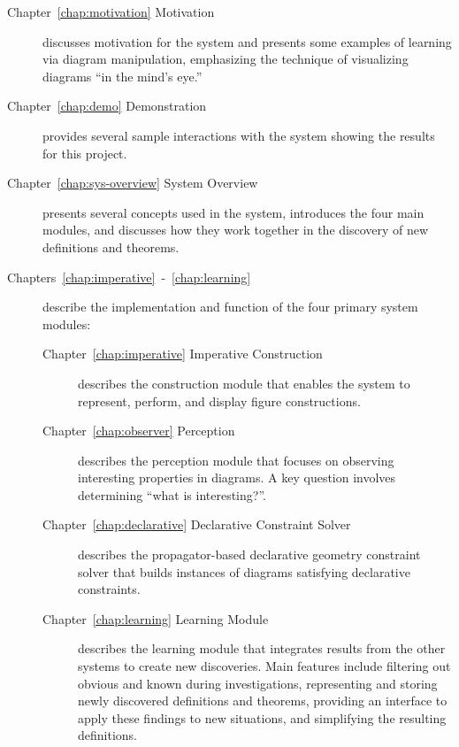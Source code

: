\begin{description}

\item [Chapter~\ref{chap:motivation} Motivation] discusses motivation
  for the system and presents some examples of learning via diagram
  manipulation, emphasizing the technique of visualizing diagrams ``in
  the mind's eye.''

\item [Chapter~\ref{chap:demo} Demonstration] provides several sample
  interactions with the system showing the results for this project.

\item[Chapter~\ref{chap:sys-overview} System Overview] presents
  several concepts used in the system, introduces the four main
  modules, and discusses how they work together in the discovery of
  new definitions and theorems.

\item[Chapters~\ref{chap:imperative}~-~\ref{chap:learning}] describe
  the implementation and function of the four primary system modules:

\begin{description}
\item[Chapter~\ref{chap:imperative} Imperative Construction]
  describes the construction module that enables the system to
  represent, perform, and display figure constructions.

\item[Chapter~\ref{chap:observer} Perception] describes the perception
  module that focuses on observing interesting properties in
  diagrams. A key question involves determining ``what is
  interesting?''.

\item[Chapter~\ref{chap:declarative} Declarative Constraint Solver]
  describes the propagator-based declarative geometry constraint
  solver that builds instances of diagrams satisfying declarative
  constraints.

\item[Chapter~\ref{chap:learning} Learning Module] describes the
  learning module that integrates results from the other systems to
  create new discoveries. Main features include filtering out obvious
  and known during investigations, representing and storing
  newly discovered definitions and theorems, providing an interface to
  apply these findings to new situations, and simplifying the
  resulting definitions.

\end{description}
\newpage


\end{description}

